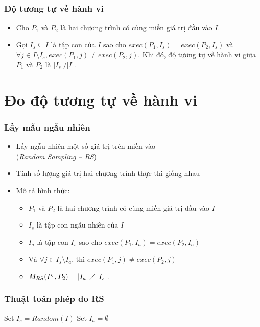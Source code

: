 \documentclass{beamer}
\begin{document}
\begin{frame}
  \frametitle{Độ tương tự về hành vi}
  \begin{itemize}
  	\item  Cho $P_{1}$ và $P_{2}$ là hai chương trình có cùng miền giá trị đầu
  	vào $I$. 
  	\item Gọi $I_{s} \subseteq I$ là tập con của $I$ sao cho
  	$exec(P_{1}, I_{s}) = exec(P_{2}, I_{s})$ và
  	$\forall j \in I \setminus I_{s}, exec(P_{1}, j) \neq exec(P_{2},
  	j)$. Khi đó, độ tương tự về hành vi giữa $P_1$ và $P_2$ là $|I_s|/|I|$.
  \end{itemize}
\end{frame}


\section{Đo độ tương tự về hành vi}
\begin{frame}
  \frametitle{Lấy mẫu ngẫu nhiên}
  \begin{itemize}  	
  	\item Lấy ngẫu nhiên một số giá trị trên miền vào \\(\emph{Random
  		Sampling -- RS})
  	\item Tính số lượng giá trị hai chương trình
  	thực thi giống nhau
  	\item Mô tả hình thức:
  	\begin{itemize}
  		\item $P_{1}$ và $P_{2}$ là hai chương trình có cùng miền giá trị đầu
  		vào $I$
  		\item $I_{s}$ là tập con ngẫu nhiên của $I$
  		\item $I_{a}$ là tập con
  		$I_{s}$ sao cho $exec(P_{1}, I_a) = exec(P_{2}, I_a)$
  		\item Và $\forall j \in I_{s} \setminus I_{a}$, thì
  		$exec(P_{1}, j) \neq exec(P_{2}, j)$
  		\item $M_{RS}(P_{1}, P_{2}) = \left|I_{a}\right| \diagup
  		\left|I_{s}\right| $.
  	\end{itemize}
  \end{itemize}
\end{frame}


\begin{frame}
  \frametitle{Thuật toán phép đo RS}
  \begin{algorithm}[H]
	Set $I_{s} = Random(I)$ \;
	Set $I_{a} = \emptyset$\;
  	{  			
  	}
  \end{algorithm}
\end{frame}
\end{document}
